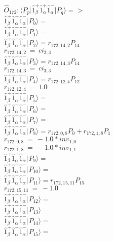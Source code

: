 \documentclass[14pt]{article}
\begin{document}
    $\hat{O}_{172}:  \langle{P_p}\vert \hat{1}_{\beta}^{+}\hat{1}_{\alpha}^{+}\hat{1}_{\alpha}^{-} \vert{P_q}\rangle => $ \\ 
    $ \hat{1}_{\beta}^{+}\hat{1}_{\alpha}^{+}\hat{1}_{\alpha}^{-} \vert{P_{0}}\rangle =  $ \\ 
    $ \hat{1}_{\beta}^{+}\hat{1}_{\alpha}^{+}\hat{1}_{\alpha}^{-} \vert{P_{1}}\rangle =  $ \\ 
    $ \hat{1}_{\beta}^{+}\hat{1}_{\alpha}^{+}\hat{1}_{\alpha}^{-} \vert{P_{2}}\rangle = {r}_{172,14,2}P_{14} $ \\ 
    ${r}_{172,14,2}\ =\ {ci}_{2,3} $ \\ 
    $ \hat{1}_{\beta}^{+}\hat{1}_{\alpha}^{+}\hat{1}_{\alpha}^{-} \vert{P_{3}}\rangle = {r}_{172,14,3}P_{14} $ \\ 
    ${r}_{172,14,3}\ =\ {ci}_{3,3} $ \\ 
    $ \hat{1}_{\beta}^{+}\hat{1}_{\alpha}^{+}\hat{1}_{\alpha}^{-} \vert{P_{4}}\rangle = {r}_{172,12,4}P_{12} $ \\ 
    ${r}_{172,12,4}\ =\ 1.0 $ \\ 
    $ \hat{1}_{\beta}^{+}\hat{1}_{\alpha}^{+}\hat{1}_{\alpha}^{-} \vert{P_{5}}\rangle =  $ \\ 
    $ \hat{1}_{\beta}^{+}\hat{1}_{\alpha}^{+}\hat{1}_{\alpha}^{-} \vert{P_{6}}\rangle =  $ \\ 
    $ \hat{1}_{\beta}^{+}\hat{1}_{\alpha}^{+}\hat{1}_{\alpha}^{-} \vert{P_{7}}\rangle =  $ \\ 
    $ \hat{1}_{\beta}^{+}\hat{1}_{\alpha}^{+}\hat{1}_{\alpha}^{-} \vert{P_{8}}\rangle = {r}_{172,0,8}P_{0}+{r}_{172,1,8}P_{1} $ \\ 
    ${r}_{172,0,8}\ =\ -1.0*{inv}_{1,0} $ \\ 
    ${r}_{172,1,8}\ =\ -1.0*{inv}_{1,1} $ \\ 
    $ \hat{1}_{\beta}^{+}\hat{1}_{\alpha}^{+}\hat{1}_{\alpha}^{-} \vert{P_{9}}\rangle =  $ \\ 
    $ \hat{1}_{\beta}^{+}\hat{1}_{\alpha}^{+}\hat{1}_{\alpha}^{-} \vert{P_{10}}\rangle =  $ \\ 
    $ \hat{1}_{\beta}^{+}\hat{1}_{\alpha}^{+}\hat{1}_{\alpha}^{-} \vert{P_{11}}\rangle = {r}_{172,15,11}P_{15} $ \\ 
    ${r}_{172,15,11}\ =\ -1.0 $ \\ 
    $ \hat{1}_{\beta}^{+}\hat{1}_{\alpha}^{+}\hat{1}_{\alpha}^{-} \vert{P_{12}}\rangle =  $ \\ 
    $ \hat{1}_{\beta}^{+}\hat{1}_{\alpha}^{+}\hat{1}_{\alpha}^{-} \vert{P_{13}}\rangle =  $ \\ 
    $ \hat{1}_{\beta}^{+}\hat{1}_{\alpha}^{+}\hat{1}_{\alpha}^{-} \vert{P_{14}}\rangle =  $ \\ 
    $ \hat{1}_{\beta}^{+}\hat{1}_{\alpha}^{+}\hat{1}_{\alpha}^{-} \vert{P_{15}}\rangle =  $ \\ 
    
\end{document}
